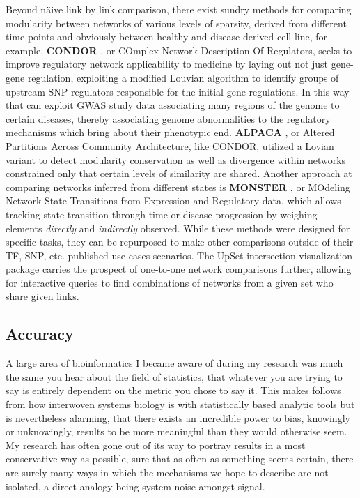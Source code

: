 Beyond n{\"a}ive link by link comparison, there exist sundry methods for comparing modularity between networks of various levels of sparsity, derived from different time points and obviously between healthy and disease derived cell line, for example. \textbf{CONDOR} \cite{platig2016bipartite}, or COmplex Network Description Of Regulators, seeks to improve regulatory network applicability to medicine by laying out not just gene-gene regulation, exploiting a modified Louvian algorithm to identify groups of upstream SNP regulators responsible for the initial gene regulations. In this way that can exploit GWAS study data associating many regions of the genome to certain diseases, thereby associating genome abnormalities to the regulatory mechanisms which bring about their phenotypic end. \textbf{ALPACA} \cite{padi2018detecting}, or Altered Partitions Across Community Architecture, like CONDOR,  utilized a Lovian variant to detect modularity conservation as well as divergence within networks constrained only that certain levels of similarity are shared. Another approach at comparing networks inferred from different states is \textbf{MONSTER} \cite{schlauch2017estimating}, or MOdeling Network State Transitions from Expression and Regulatory data, which allows tracking state transition through time or disease progression by weighing elements \emph{directly} and \emph{indirectly} observed. While these methods were designed for specific tasks, they can be repurposed to make other comparisons outside of their TF, SNP, etc. published use cases scenarios. The UpSet \cite{lex2014upset} intersection visualization package carries the prospect of one-to-one network comparisons further, allowing for interactive queries to find combinations of networks from a given set who share given links.

\subsection{Accuracy}
\label{sec:acc}

A large area of bioinformatics I became aware of during my research was much the same you hear about the field of statistics, that whatever you are trying to say is entirely dependent on the metric you chose to say it. This makes follows from how interwoven systems biology is with statistically based analytic tools but is nevertheless alarming, that there exists an incredible power to bias, knowingly or unknowingly, results to be more meaningful than they would otherwise seem. My research has often gone out of its way to portray results in a most conservative way as possible, sure that as often as something seems certain, there are surely many ways in which the mechanisms we hope to describe are not isolated, a direct analogy being system noise amongst signal.

